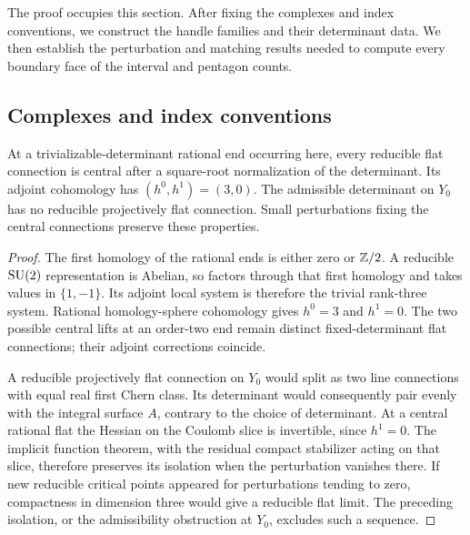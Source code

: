 The proof occupies this section.  After fixing the complexes and index
conventions, we construct the
handle families and their determinant data.  We then establish the
perturbation and matching results needed to compute every boundary
face of the interval and pentagon counts.

\subsection{Complexes and index conventions}

\begin{lemma}
\label{lem:ordinary:central-ends}
At a trivializable-determinant rational end occurring here, every
reducible flat connection is central after a square-root normalization
of the determinant.  Its adjoint cohomology has
$(h^0,h^1)=(3,0)$.  The admissible determinant on $Y_0$ has no reducible
projectively flat connection.  Small perturbations fixing the central
connections preserve these properties.
\end{lemma}
\begin{proof}
The first homology of the rational ends is either zero or $\mathbb Z/2$.
A reducible $\operatorname{SU}(2)$ representation is Abelian, so factors through that
first homology and takes values in $\{1,-1\}$.  Its adjoint local system
is therefore the trivial rank-three system.  Rational homology-sphere
cohomology gives $h^0=3$ and $h^1=0$.  The two possible central lifts
at an order-two end remain distinct fixed-determinant flat connections;
their adjoint corrections coincide.

A reducible projectively flat connection on $Y_0$ would split as two
line connections with equal real first Chern class.  Its determinant
would consequently pair evenly with the integral surface $A$, contrary
to the choice of determinant.  At a central rational flat the Hessian
on the Coulomb slice is invertible, since $h^1=0$.  The implicit function
theorem, with the residual compact stabilizer acting on that slice,
therefore preserves its isolation when the perturbation vanishes there.
If new reducible critical points appeared for perturbations tending
to zero, compactness in dimension three would give a reducible flat
limit.  The preceding isolation, or the admissibility obstruction at
$Y_0$, excludes such a sequence.
\end{proof}


